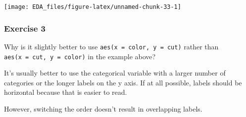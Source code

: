 \documentclass[]{book}
\newenvironment{Shaded}{\begin{snugshade}}{\end{snugshade}}
\newcommand{\DataTypeTok}[1]{\textcolor[rgb]{0.13,0.29,0.53}{#1}}
\newcommand{\DecValTok}[1]{\textcolor[rgb]{0.00,0.00,0.81}{#1}}
\newcommand{\KeywordTok}[1]{\textcolor[rgb]{0.13,0.29,0.53}{\textbf{#1}}}
\newcommand{\NormalTok}[1]{#1}
\newcommand{\OperatorTok}[1]{\textcolor[rgb]{0.81,0.36,0.00}{\textbf{#1}}}
\newcommand{\OtherTok}[1]{\textcolor[rgb]{0.56,0.35,0.01}{#1}}
\newcommand{\StringTok}[1]{\textcolor[rgb]{0.31,0.60,0.02}{#1}}
\theoremstyle{definition}
\theoremstyle{definition}
\theoremstyle{definition}
\theoremstyle{remark}
\begin{document}
\begin{Shaded}
\end{Shaded}

\begin{center}\texttt{[image: EDA\_files/figure-latex/unnamed-chunk-33-1]} \end{center}

\hypertarget{exercise-3-8}{%
\subsubsection{Exercise 3}\label{exercise-3-8}}

Why is it slightly better to use \texttt{aes(x\ =\ color,\ y\ =\ cut)}
rather than \texttt{aes(x\ =\ cut,\ y\ =\ color)} in the example above?

It's usually better to use the categorical variable with a larger number
of categories or the longer labels on the y axis. If at all possible,
labels should be horizontal because that is easier to read.

However, switching the order doesn't result in overlapping labels.
\end{document}
